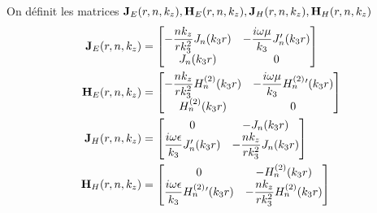     \begin{defn}
        On définit les matrices \(\mathbf{J}_{E}(r,n,k_z),\mathbf{H}_{E}(r,n,k_z),\mathbf{J}_{H}(r,n,k_z),\mathbf{H}_{H}(r,n,k_z)\)
        \begin{align}
            \mathbf{J}_{E}(r,n,k_z) &= 
            \begin{bmatrix}
                -\dfrac{nk_z}{rk_3^2}J_n(k_3r) & -\dfrac{i\omega\mu}{k_3}J_n'(k_3r)
                \\
                J_n(k_3r) & 0
            \end{bmatrix}
            \\
            \mathbf{H}_{E}(r,n,k_z) &= 
            \begin{bmatrix}
                -\dfrac{nk_z}{rk_3^2}H_n^{(2)}(k_3r) & -\dfrac{i\omega\mu}{k_3}H_n^{(2)}{}'(k_3r)
                \\
                H_n^{(2)}(k_3r) & 0
            \end{bmatrix}
            \\
            \mathbf{J}_{H}(r,n,k_z) &= 
            \begin{bmatrix}
                0 & -J_n(k_3r)
                \\
                \dfrac{i\omega\epsilon}{k_3}J_n'(k_3r) & -\dfrac{nk_z}{rk_3^2}J_n(k_3r)
            \end{bmatrix}
            \\
            \mathbf{H}_{H}(r,n,k_z) &= 
            \begin{bmatrix}
                0 & -H_n^{(2)}(k_3r)
                \\
                \dfrac{i\omega\epsilon}{k_3}H_n^{(2)}{}'(k_3r) & -\dfrac{nk_z}{rk_3^2}H_n^{(2)}(k_3r)
            \end{bmatrix}
        \end{align}
    \end{defn}


